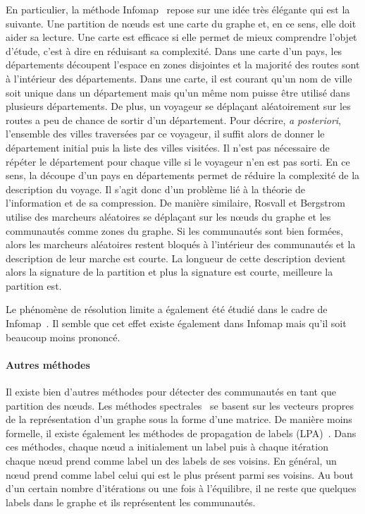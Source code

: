 En particulier, la méthode Infomap~\cite{Rosvall2008} repose sur une idée très élégante qui est la suivante.
Une partition de n\oe{}uds est une carte du graphe et, en ce sens, elle doit aider sa lecture.
Une carte est efficace si elle permet de mieux comprendre l'objet d'étude, c'est à dire en réduisant sa complexité.
Dans une carte d'un pays, les départements découpent l'espace en zones disjointes et la majorité des routes sont à l'intérieur des départements.
Dans une carte, il est courant qu'un nom de ville soit unique dans un département mais qu'un même nom puisse être utilisé dans plusieurs départements.
De plus, un voyageur se déplaçant aléatoirement sur les routes a peu de chance de sortir d'un département.
Pour décrire, \emph{a posteriori}, l'ensemble des villes traversées par ce voyageur, il suffit alors de donner le département initial puis la liste des villes visitées.
Il n'est pas nécessaire de répéter le département pour chaque ville si le voyageur n'en est pas sorti.
En ce sens, la découpe d'un pays en départements permet de réduire la complexité de la description du voyage.
Il s'agit donc d'un problème lié à la théorie de l'information et de sa compression.
De manière similaire, Rosvall et Bergstrom utilise des marcheurs aléatoires se déplaçant sur les n\oe{}uds du graphe et les communautés comme zones du graphe.
Si les communautés sont bien formées, alors les marcheurs aléatoires restent bloqués à l'intérieur des communautés et la description de leur marche est courte.
La longueur de cette description devient alors la signature de la partition et plus la signature est courte, meilleure la partition est.

Le phénomène de résolution limite a également été étudié dans le cadre de Infomap~\cite{Kawamoto2015}.
Il semble que cet effet existe également dans Infomap mais qu'il soit beaucoup moins prononcé.

\paragraph{Autres méthodes}
Il existe bien d'autres méthodes pour détecter des communautés en tant que partition des n\oe{}uds.
Les méthodes spectrales~\cite{Donetti2004,Mitrovic2009} se basent sur les vecteurs propres de la représentation d'un graphe sous la forme d'une matrice.
De manière moins formelle, il existe également les méthodes de propagation de labels (LPA)~\cite{Raghavan2007a,Li2014c}.
Dans ces méthodes, chaque n\oe{}ud a initialement un label puis à chaque itération chaque n\oe{}ud prend comme label un des labels de ses voisins.
En général, un n\oe{}ud prend comme label celui qui est le plus présent parmi ses voisins.
Au bout d'un certain nombre d'itérations ou une fois à l'équilibre, il ne reste que quelques labels dans le graphe et ils représentent les communautés.


